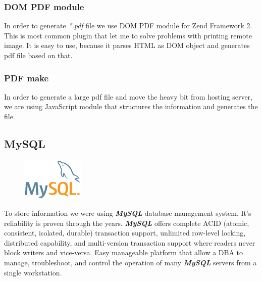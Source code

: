 			\subsubsection{DOM PDF module}
			In order to generate \textit{*.pdf} file we use DOM PDF module for Zend Framework 2. This is most common plugin that let me to solve problems with printing remote image. It is easy to use, because it parses HTML as DOM object and generates pdf file based on that.~\cite{DOM_PDF_module}

			\subsubsection{PDF make}
			In order to generate a large pdf file and move the heavy bit from hosting server, we are using JavaScript module that structures the information and generates the file.
			\cite{PDF_Make_module}
			
    \subsection{MySQL}
\begin{figure}
	\includegraphics[width=3cm]{img/zf2/mysql-logo.png}
\end{figure} 
To store information we were using \textbf{\textit{MySQL}} database management system. It's reliability is proven through the years. \textbf{\textit{MySQL}} offers complete ACID (atomic, consistent, isolated, durable) transaction support, unlimited row-level locking, distributed capability, and multi-version transaction support where readers never block writers and vice-versa. Easy manageable platform that allow a DBA to manage, troubleshoot, and control the operation of many \textbf{\textit{MySQL}} servers from a single workstation. ~\cite{MySQL_Top10_Reasons}

